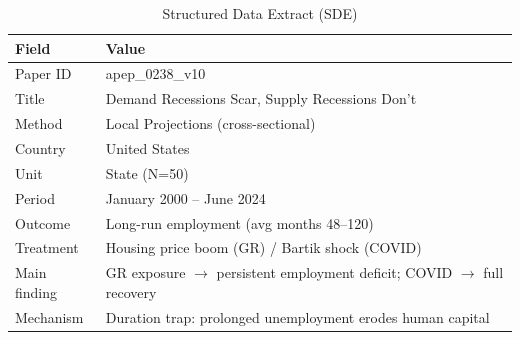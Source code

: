 \begin{table}[H]
\centering
\caption{Structured Data Extract (SDE)}
\begin{threeparttable}
\small
\begin{tabular}{ll}
\toprule
Field & Value \\
\midrule
Paper ID & apep\_0238\_v10 \\
Title & Demand Recessions Scar, Supply Recessions Don't \\
Method & Local Projections (cross-sectional) \\
Country & United States \\
Unit & State (N=50) \\
Period & January 2000 -- June 2024 \\
Outcome & Long-run employment (avg months 48--120) \\
Treatment & Housing price boom (GR) / Bartik shock (COVID) \\
Main finding & GR exposure $\rightarrow$ persistent employment deficit; COVID $\rightarrow$ full recovery \\
Mechanism & Duration trap: prolonged unemployment erodes human capital \\
\bottomrule
\end{tabular}
\end{threeparttable}
\label{tab:sde}
\end{table}
